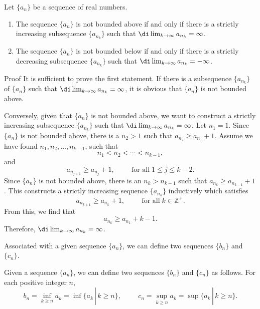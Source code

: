 \begin{theorem}[label=230603_2]{}
Let $\{a_n\}$ be a sequence of real numbers.
\begin{enumerate}[1.]
\item The sequence $\{a_n\}$ is  not bounded above if and only if there is a strictly increasing subsequence $\{a_{n_k}\} $ such that $\di\lim_{k\to\infty}a_{n_k}=\infty$.
\item The sequence $\{a_n\}$ is  not bounded below if and only if there is a strictly decreasing subsequence $\{a_{n_k}\} $ such that $\di\lim_{k\to\infty}a_{n_k}=-\infty$.

\end{enumerate}
\end{theorem}
\begin{myproof}
{Proof}
It is sufficient to prove the first statement. If there is a subsequence $\{a_{n_k}\}$ of $\{a_n\}$ such that $\di\lim_{k\to\infty}a_{n_k}=\infty$, it is obvious that $\{a_n\}$ is not bounded above. 

Conversely,
 given that $\{a_n\}$ is not bounded above, we want to construct a strictly increasing subsequence $\{a_{n_k}\}$  such that $\di\lim_{k\to\infty}a_{n_k}=\infty$.  Let $n_1=1$. 
Since $\{a_n\}$ is not bounded above, there is a $n_2 >1$ such that $a_{n_2}\geq a_{n_1}+1$. Assume we have found $n_1, n_2, \ldots, n_{k-1}$, such that
\[n_1<n_2<\cdots<n_{k-1},\]and
\[a_{n_{j+1}}\geq a_{n_{j}}+1, \hspace{1cm}\text{for all}\;1\leq j\leq k-2.\]Since $\{a_n\}$ is not bounded above, there is an $n_k>n_{k-1}$ such that $a_{n_k}\geq a_{n_{k-1}}+1$. This constructs a strictly increasing sequence $\{a_{n_k}\}$ inductively which satisfies
\[ a_{n_{k+1}}\geq a_{n_{k}}+1, \hspace{1cm}\text{for all}\;k\in\mathbb{Z}^+.\] From this, we find that
\[a_{n_k}\geq a_{n_1}+k-1.\]  Therefore,  $\di\lim_{k\to\infty}a_{n_k}=\infty$.



\end{myproof}
Associated with a given sequence $\{a_n\}$, we can define two sequences $\{b_n\}$ and $\{c_n\}$.
\begin{definition}{}
Given a sequence $\{a_n\}$, we can define two sequences $\{b_n\}$ and $\{c_n\}$ as follows. For each positive integer $n$,  
\[b_n=\inf_{k\geq n}a_k=\inf\{a_k\,|\,k\geq n\},\hspace{1cm}c_n=\sup_{k\geq n}a_k=\sup\{a_k\,|\,k\geq n\}.\]

\end{definition}



